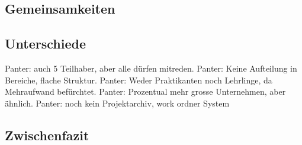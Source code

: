 \subsection{Gemeinsamkeiten}

\subsection{Unterschiede}
Panter: auch 5 Teilhaber, aber alle dürfen mitreden.
Panter: Keine Aufteilung in Bereiche, flache Struktur.
Panter: Weder Praktikanten noch Lehrlinge, da Mehraufwand befürchtet.
Panter: Prozentual mehr grosse Unternehmen, aber ähnlich.
Panter: noch kein Projektarchiv, work ordner System

\subsection{Zwischenfazit}
